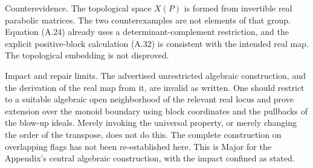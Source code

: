 \documentclass[10pt]{article}
\begin{document}
Counterevidence. The topological space \(X(P)\) is formed from invertible real parabolic matrices. The two counterexamples are not elements of that group. Equation (A.24) already uses a determinant-complement restriction, and the explicit positive-block calculation (A.32) is consistent with the intended real map. The topological embedding is not disproved.\par
Impact and repair limits. The advertised unrestricted algebraic construction, and the derivation of the real map from it, are invalid as written. One should restrict to a suitable algebraic open neighborhood of the relevant real locus and prove extension over the monoid boundary using block coordinates and the pullbacks of the blow-up ideals. Merely invoking the universal property, or merely changing the order of the transpose, does not do this. The complete construction on overlapping flags has not been re-established here. This is Major for the Appendix’s central algebraic construction, with the impact confined as stated.\par
\end{document}
